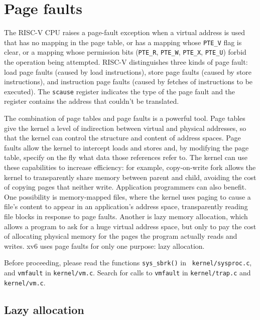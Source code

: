 \chapter{Page faults}
\label{CH:PGFAULTS}

The RISC-V CPU raises a page-fault exception
when a virtual address is used that has no mapping
in the page table, or has a mapping whose \lstinline{PTE_V}
flag is clear, or a mapping whose permission bits
(\lstinline{PTE_R},
\lstinline{PTE_W},
\lstinline{PTE_X},
\lstinline{PTE_U})
forbid the operation being attempted.
RISC-V distinguishes three
kinds of page fault: load page faults (caused by load instructions),
store page faults (caused by store instructions),
and instruction
page faults (caused by fetches of instructions to be executed).  The
\lstinline{scause} register indicates the type of the
page fault and the  register contains the address
that couldn't be translated.

The combination of page tables and page faults is a powerful tool.
Page tables give the kernel a level of indirection between virtual and
physical addresses, so that the kernel can control the structure and
content of address spaces. Page faults allow the kernel to intercept
loads and stores and, by modifying the page table, specify on the fly
what data those references refer to. The kernel can use these
capabilities to increase efficiency: for example, copy-on-write fork
allows the kernel to transparently share memory between parent and
child, avoiding the cost of copying pages that neither write.
Application programmers can also benefit. One possibility is
memory-mapped files, where the kernel uses paging to cause a file's
content to appear in an application's address space, transparently
reading file blocks in response to page faults. Another is lazy memory
allocation, which allows a program to ask for a huge virtual
address space, but only to pay the cost of allocating physical memory
for the pages the program actually reads and writes. xv6 uses page
faults for only one purpose: lazy allocation.

Before proceeding, please read the functions {\tt sys\_sbrk()} in {\tt
  kernel/sysproc.c}, and {\tt vmfault} in {\tt kernel/vm.c}.
Search for calls to {\tt vmfault} in {\tt kernel/trap.c} and {\tt
kernel/vm.c}.

\section{Lazy allocation}
\label{sec:lazy}

